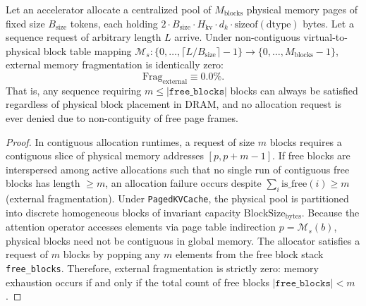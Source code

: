 \begin{theorem}
\label{thm:zero_external_frag}
Let an accelerator allocate a centralized pool of $M_{\text{blocks}}$ physical memory pages of fixed size $B_{\text{size}}$ tokens, each holding $2 \cdot B_{\text{size}} \cdot H_{\text{kv}} \cdot d_k \cdot \text{sizeof}(\text{dtype})$ bytes. Let a sequence request of arbitrary length $L$ arrive. Under non-contiguous virtual-to-physical block table mapping $\mathcal{M}_s: \{0, \dots, \lceil L / B_{\text{size}} \rceil - 1\} \to \{0, \dots, M_{\text{blocks}} - 1\}$, external memory fragmentation is identically zero:
\begin{equation}
\label{eq:zero_external_frag}
\text{Frag}_{\text{external}} \equiv 0.0\%.
\end{equation}
That is, any sequence requiring $m \le |\texttt{free\_blocks}|$ blocks can always be satisfied regardless of physical block placement in DRAM, and no allocation request is ever denied due to non-contiguity of free page frames.
\end{theorem}

\begin{proof}
In contiguous allocation runtimes, a request of size $m$ blocks requires a contiguous slice of physical memory addresses $[p, p+m-1]$. If free blocks are interspersed among active allocations such that no single run of contiguous free blocks has length $\ge m$, an allocation failure occurs despite $\sum_{i} \text{is\_free}(i) \ge m$ (external fragmentation). 
Under \texttt{PagedKVCache}, the physical pool is partitioned into discrete homogeneous blocks of invariant capacity $\text{BlockSize}_{\text{bytes}}$. Because the attention operator accesses elements via page table indirection $p = \mathcal{M}_s(b)$, physical blocks need not be contiguous in global memory. The allocator satisfies a request of $m$ blocks by popping any $m$ elements from the free block stack \texttt{free\_blocks}. Therefore, external fragmentation is strictly zero: memory exhaustion occurs if and only if the total count of free blocks $|\texttt{free\_blocks}| < m$.
\end{proof}

